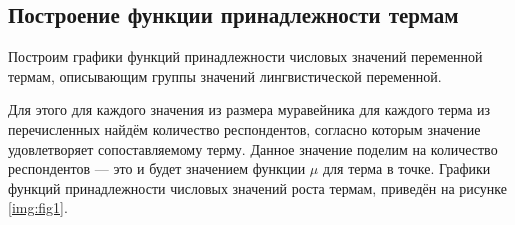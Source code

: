 \subsection{Построение функции принадлежности термам}

Построим графики функций принадлежности числовых значений переменной термам, описывающим группы значений лингвистической переменной.

Для этого для каждого значения из размера муравейника для каждого терма из перечисленных найдём количество респондентов, согласно которым значение удовлетворяет сопоставляемому терму.
Данное значение поделим на количество респондентов --- это и будет значением функции $\mu$ для терма в точке.
Графики функций принадлежности числовых значений роста термам, приведён на рисунке \ref{img:fig1}.

